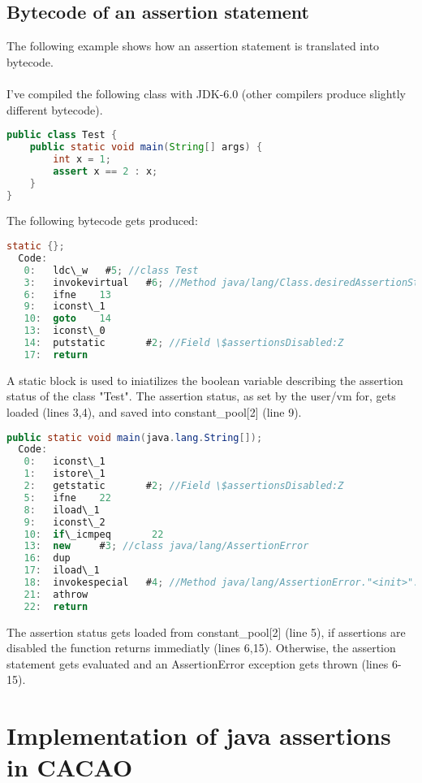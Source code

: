 \documentclass{article}%
\begin{document}
\subsection{Bytecode of an assertion statement} \label{bytecode}
The following example shows how an assertion statement is translated into bytecode.
\\
\\
I've compiled the following class with JDK-6.0 (other compilers produce slightly different bytecode).
\begin{lstlisting}[language=Java]
public class Test {
    public static void main(String[] args) {
        int x = 1;
        assert x == 2 : x;
    }
}
\end{lstlisting}
The following bytecode gets produced:
\\
\begin{lstlisting}[language=Java]
static {};
  Code:
   0:   ldc\_w   #5; //class Test
   3:   invokevirtual   #6; //Method java/lang/Class.desiredAssertionStatus:()Z
   6:   ifne    13
   9:   iconst\_1
   10:  goto    14
   13:  iconst\_0
   14:  putstatic       #2; //Field \$assertionsDisabled:Z
   17:  return
\end{lstlisting}
A static block is used to iniatilizes the boolean variable describing the assertion status of the class "Test".
The assertion status, as set by the user/vm for, gets loaded (lines 3,4), and saved into constant\_pool[2] (line 9).
\\
\begin{lstlisting}[language=Java]
public static void main(java.lang.String[]);
  Code:
   0:   iconst\_1
   1:   istore\_1
   2:   getstatic       #2; //Field \$assertionsDisabled:Z
   5:   ifne    22
   8:   iload\_1
   9:   iconst\_2
   10:  if\_icmpeq       22
   13:  new     #3; //class java/lang/AssertionError
   16:  dup
   17:  iload\_1
   18:  invokespecial   #4; //Method java/lang/AssertionError."<init>":(I)V
   21:  athrow
   22:  return
\end{lstlisting}
The assertion status gets loaded from constant\_pool[2] (line 5), if assertions are disabled the function returns immediatly (lines 6,15). Otherwise, the assertion statement gets evaluated and an AssertionError exception gets thrown (lines 6-15).

\pagebreak
\section{Implementation of java assertions in CACAO}
\end{document}
